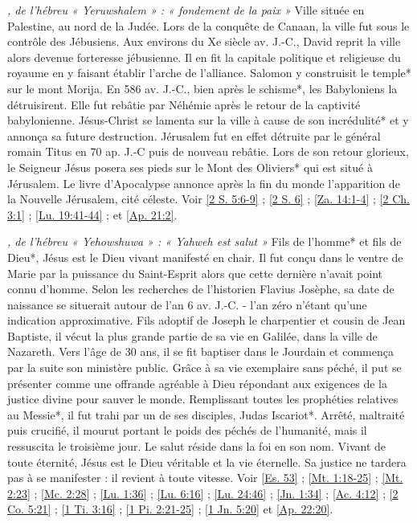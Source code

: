 \begin{multicols}{2}
\textit{, de l'hébreu « Yeruwshalem » : « fondement de la paix »}\newline
Ville située en Palestine, au nord de la Judée. Lors de la conquête de Canaan, la ville fut sous le contrôle des Jébusiens. Aux environs du Xe siècle av. J.-C., David reprit la ville alors devenue forteresse jébusienne. Il en fit la capitale politique et religieuse du royaume en y faisant établir l'arche de l'alliance. Salomon y construisit le temple* sur le mont Morija. En 586 av. J.-C., bien après le schisme*, les Babyloniens la détruisirent. Elle fut rebâtie par Néhémie après le retour de la captivité babylonienne. Jésus-Christ se lamenta sur la ville à cause de son incrédulité* et y annonça sa future destruction. Jérusalem fut en effet détruite par le général romain Titus en 70 ap. J.-C puis de nouveau rebâtie. Lors de son retour glorieux, le Seigneur Jésus posera ses pieds sur le Mont des Oliviers* qui est situé à Jérusalem. Le livre d'Apocalypse annonce après la fin du monde l'apparition de la Nouvelle Jérusalem, cité céleste. Voir \vref{2 S. 5:6-9} ; \vref{2 S. 6} ; \vref{Za. 14:1-4} ; \vref{2 Ch. 3:1} ; \vref{Lu. 19:41-44} ; et \vref{Ap. 21:2}.

\textit{, de l'hébreu « Yehowshuwa » : « Yahweh est salut »}\newline
Fils de l'homme* et fils de Dieu*, Jésus est le Dieu vivant manifesté en chair. Il fut conçu dans le ventre de Marie par la puissance du Saint-Esprit alors que cette dernière n'avait point connu d'homme. Selon les recherches de l'historien Flavius Josèphe, sa date de naissance se situerait autour de l'an 6 av. J.-C. - l'an zéro n'étant qu'une indication approximative. Fils adoptif de Joseph le charpentier et cousin de Jean Baptiste, il vécut la plus grande partie de sa vie en Galilée, dans la ville de Nazareth. Vers l'âge de 30 ans, il se fit baptiser dans le Jourdain et commença par la suite son ministère public. Grâce à sa vie exemplaire sans péché, il put se présenter comme une offrande agréable à Dieu répondant aux exigences de la justice divine pour sauver le monde. Remplissant toutes les prophéties relatives au Messie*, il fut trahi par un de ses disciples, Judas Iscariot*. Arrêté, maltraité puis crucifié, il mourut portant le poids des péchés de l'humanité, mais il ressuscita le troisième jour. Le salut réside dans la foi en son nom. Vivant de toute éternité, Jésus est le Dieu véritable et la vie éternelle. Sa justice ne tardera pas à se manifester : il revient à toute vitesse. Voir \vref{Es. 53} ; \vref{Mt. 1:18-25} ; \vref{Mt. 2:23} ; \vref{Mc. 2:28} ; \vref{Lu. 1:36} ; \vref{Lu. 6:16} ; \vref{Lu. 24:46} ; \vref{Jn. 1:34} ; \vref{Ac. 4:12} ; \vref{2 Co. 5:21} ; \vref{1 Ti. 3:16} ; \vref{1 Pi. 2:21-25} ; \vref{1 Jn. 5:20} et \vref{Ap. 22:20}.


\end{multicols}
